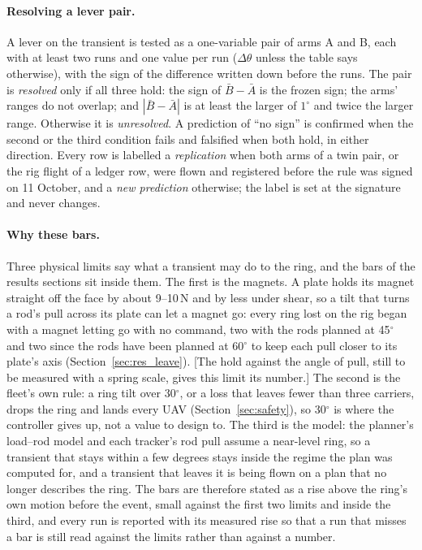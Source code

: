 \paragraph{Resolving a lever pair.} A lever on the transient is tested as a one-variable pair of arms A and B,
each with at least two runs and one value per run ($\Delta\theta$ unless the table says otherwise), with the
sign of the difference written down before the runs. The pair is \emph{resolved} only if all three hold: the
sign of $\bar{B}-\bar{A}$ is the frozen sign; the arms' ranges do not overlap; and $|\bar{B}-\bar{A}|$ is at
least the larger of $1^\circ$ and twice the larger range. Otherwise it is \emph{unresolved}. A prediction of
``no sign'' is confirmed when the second or the third condition fails and falsified when both hold, in either
direction. Every row is labelled a \emph{replication} when both arms of a twin pair, or the rig flight of a
ledger row, were flown and registered before the rule was signed on 11 October, and a \emph{new prediction}
otherwise; the label is set at the signature and never changes.

\paragraph{Why these bars.} Three physical limits say what a transient may do to the ring, and the bars of the
results sections sit inside them. The first is the magnets. A plate holds its magnet straight off the face by
about 9--10\,N and by less under shear, so a tilt that turns a rod's pull across its plate can let a magnet go:
every ring lost on the rig began with a magnet letting go with no command, two with the rods planned at
45$^\circ$ and two since the rods have been planned at 60$^\circ$ to keep each pull closer to its plate's axis
(Section~\ref{sec:res_leave}). [The hold against the angle of pull, still to be measured with a spring scale,
gives this limit its number.] The second is the fleet's own rule:
a ring tilt over 30$^\circ$, or a loss that leaves fewer than three carriers, drops the ring and lands every UAV
(Section~\ref{sec:safety}), so
30$^\circ$ is where the controller gives up, not a value to design to. The third is the model: the planner's
load--rod model and each tracker's rod pull assume a near-level ring, so a transient that stays within a few
degrees stays inside the regime the plan was computed for, and a transient that leaves it is being flown on a
plan that no longer describes the ring. The bars are therefore stated as a rise above the ring's own motion
before the event, small against the first two limits and inside the third, and every run is reported with its
measured rise so that a run that misses a bar is still read against the limits rather than against a number.

